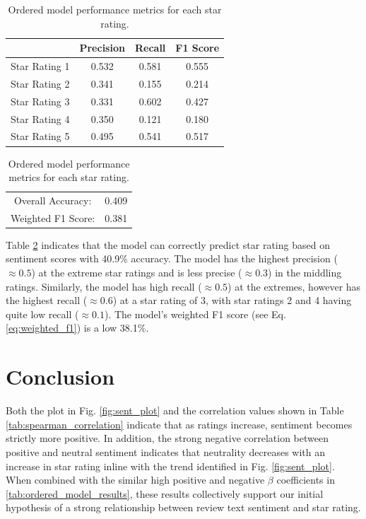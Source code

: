 \documentclass[sn-mathphys,Numbered]{sn-jnl}%
\theoremstyle{thmstyleone}%
\theoremstyle{thmstyletwo}%
\theoremstyle{thmstylethree}%
\begin{document}
\begin{table}[h!]
\centering
\begin{tabular}{l|c|c|c}
\hline
            & Precision & Recall & F1 Score \\ \hline
Star Rating 1 & 0.532     & 0.581  & 0.555    \\
Star Rating 2 & 0.341     & 0.155  & 0.214    \\
Star Rating 3 & 0.331     & 0.602  & 0.427    \\
Star Rating 4 & 0.350     & 0.121  & 0.180    \\
Star Rating 5 & 0.495     & 0.541  & 0.517    \\ \hline
\end{tabular}

\begin{tabular}{c|c}
Overall Accuracy: & 0.409 \\
Weighted F1 Score: & 0.381
\end{tabular} \botrule
\caption{Ordered model performance metrics for each star rating.}
\label{tab:performance_metrics}
\end{table}

Table \ref{tab:performance_metrics} indicates that the model can correctly predict star rating based on sentiment scores with 40.9\% accuracy. The model has the highest precision ($\approx0.5$) at the extreme star ratings and is less precise ($\approx0.3$) in the middling ratings. Similarly, the model has high recall ($\approx0.5$) at the extremes, however has the highest recall ($\approx0.6$) at a star rating of 3, with star ratings 2 and 4 having quite low recall ($\approx0.1$). The model's weighted F1 score (see Eq. \ref{eq:weighted_f1}) is a low 38.1\%.


\section{Conclusion}\label{sec4}

Both the plot in Fig. \ref{fig:sent_plot} and the correlation values shown in Table \ref{tab:spearman_correlation} indicate that as ratings increase, sentiment becomes strictly more positive. In addition, the strong negative correlation between positive and neutral sentiment indicates that neutrality decreases with an increase in star rating inline with the trend identified in Fig. \ref{fig:sent_plot}. When combined with the similar high positive and negative $\beta$ coefficients in \ref{tab:ordered_model_results}, these results collectively support our initial hypothesis of a strong relationship between review text sentiment and star rating.
\end{document}
